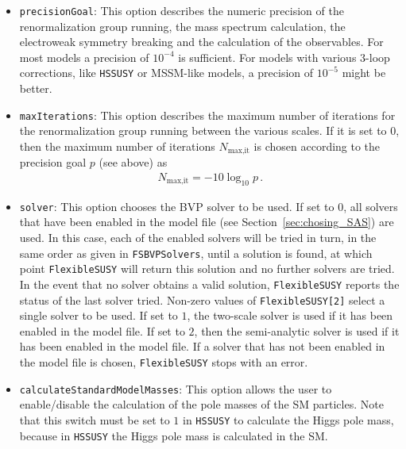 \documentclass[final,3p,11pt,pdflatex]{elsarticle}
\makeatletter
\newcommand{\modelname}[1]{\texttt{#1}\@\xspace}
\newcommand{\fs}{\texttt{FlexibleSUSY}\@\xspace}
\newcommand{\HSSUSY}{\modelname{HSSUSY}}
\newcommand{\code}[1]{\lstinline|#1|}  %
\newcommand{\secref}[1]{Section~\ref{#1}}
\makeatother
\begin{document}
\begin{itemize}
\setlength{\itemindent}{1cm}
\item[\texttt{FlexibleSUSY[0]},] \texttt{precisionGoal}: This option
  describes the numeric precision of the renormalization group
  running, the mass spectrum calculation, the electroweak symmetry
  breaking and the calculation of the observables.  For most models a
  precision of $10^{-4}$ is sufficient.  For models with various
  3-loop corrections, like \HSSUSY or MSSM-like models, a
  precision of $10^{-5}$ might be better.

\item[\texttt{FlexibleSUSY[1]},] \texttt{maxIterations}: This option
  describes the maximum number of iterations for the renormalization
  group running between the various scales.  If it is set to $0$, then
  the maximum number of iterations $N_{\text{max,it}}$ is chosen
  according to the precision goal $p$ (see above) as
  \begin{align}
    N_{\text{max,it}} = - 10\log_{10} p \,.
  \end{align}

\item[\texttt{FlexibleSUSY[2]},] \texttt{solver}: This option chooses
  the BVP solver to be used.  If set to $0$, all
  solvers that have been enabled in the model file (see
  \secref{sec:chosing_SAS}) are used.  In this case, each of the
  enabled solvers will be tried in turn, in the same order as given in
  \code{FSBVPSolvers}, until a solution is found, at which point \fs
  will return this solution and no further solvers are tried.  In the
  event that no solver obtains a valid solution, \fs reports the status of the
  last solver tried.  Non-zero values of \texttt{FlexibleSUSY[2]}
  select a single solver to be used.  If set to $1$, the two-scale
  solver is used if it has been enabled in the model file.  If set
  to $2$, then the semi-analytic solver is used if it has been enabled
  in the model file.  If a solver that has not been enabled in the model
  file is chosen, \fs stops with an error.

\item[\texttt{FlexibleSUSY[3]},]
  \texttt{calculateStandardModelMasses}: This option allows the user
  to enable/disable the calculation of the pole masses of the SM
  particles.  Note that this switch must be set to $1$ in
  \HSSUSY to calculate the Higgs pole mass, because in \HSSUSY the
  Higgs pole mass is calculated in the SM\@.


\end{itemize}
\end{document}
